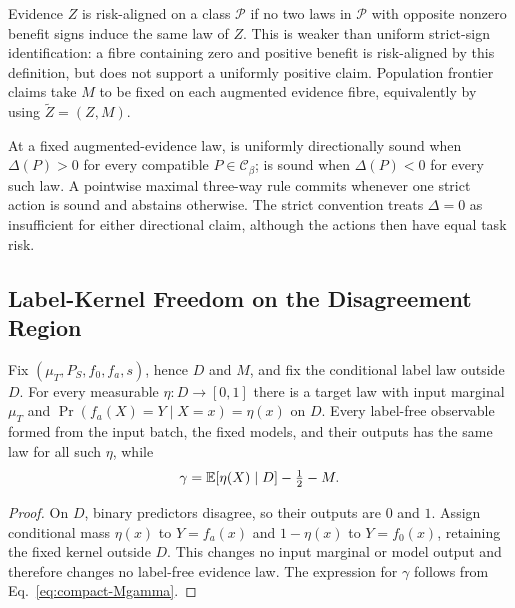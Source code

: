 \begin{definition}
\label{def:risk-align}
Evidence $Z$ is risk-aligned on a class $\mathcal P$ if no two laws in $\mathcal P$ with opposite
nonzero benefit signs induce the same law of $Z$. This is weaker than uniform strict-sign
identification: a fibre containing zero and positive benefit is risk-aligned by this definition,
but does not support a uniformly positive claim. Population frontier claims take $M$ to be fixed on each
augmented evidence fibre, equivalently by using $\widetilde Z=(Z,M)$.
\end{definition}

\begin{definition}
\label{def:strict-sound}
At a fixed augmented-evidence law, \adapt is uniformly directionally sound when $\Delta(P)>0$ for
every compatible $P\in\mathcal C_\beta$; \freeze is sound when $\Delta(P)<0$ for every such law.
A pointwise maximal three-way rule commits whenever one strict action is sound and abstains
otherwise. The strict convention treats $\Delta=0$ as insufficient for either directional claim,
although the actions then have equal task risk.
\end{definition}

\subsection{Label-Kernel Freedom on the Disagreement Region}

\begin{lemma}
\label{lem:fibre}
Fix $(\mu_T,P_S,f_0,f_a,s)$, hence $D$ and $M$, and fix the conditional label law outside $D$.
For every measurable $\eta:D\to[0,1]$ there is a target law with input marginal $\mu_T$ and
$\Pr(f_a(X)=Y\mid X=x)=\eta(x)$ on $D$. Every label-free observable formed from the input batch,
the fixed models, and their outputs has the same law for all such $\eta$, while
\[
 \gamma=\mathbb{E}[\eta(X)\mid D]-\tfrac12-M.
\]
\end{lemma}
\begin{proof}
On $D$, binary predictors disagree, so their outputs are $0$ and $1$. Assign conditional mass
$\eta(x)$ to $Y=f_a(x)$ and $1-\eta(x)$ to $Y=f_0(x)$, retaining the fixed kernel outside $D$.
This changes no input marginal or model output and therefore changes no label-free evidence law.
The expression for $\gamma$ follows from Eq.~\eqref{eq:compact-Mgamma}.
\end{proof}


